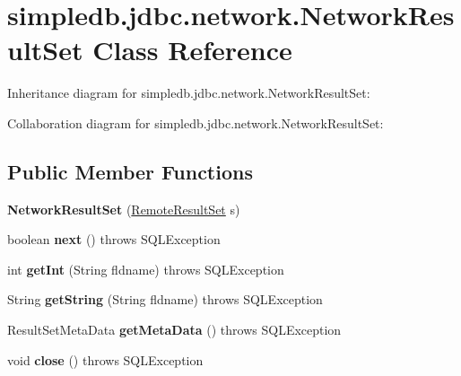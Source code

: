 \hypertarget{classsimpledb_1_1jdbc_1_1network_1_1NetworkResultSet}{}\section{simpledb.\+jdbc.\+network.\+Network\+Result\+Set Class Reference}
\label{classsimpledb_1_1jdbc_1_1network_1_1NetworkResultSet}


Inheritance diagram for simpledb.\+jdbc.\+network.\+Network\+Result\+Set\+:


Collaboration diagram for simpledb.\+jdbc.\+network.\+Network\+Result\+Set\+:
\subsection*{Public Member Functions}
\begin{DoxyCompactItemize}
\item 
\mbox{\label{classsimpledb_1_1jdbc_1_1network_1_1NetworkResultSet_a20a2fb4ef84d7cb1e9a1fdd016fba862}} 
{\bfseries Network\+Result\+Set} (\hyperlink{interfacesimpledb_1_1jdbc_1_1network_1_1RemoteResultSet}{Remote\+Result\+Set} s)
\item 
\mbox{\label{classsimpledb_1_1jdbc_1_1network_1_1NetworkResultSet_aeca07802f038885f05fd6a73cfcdc227}} 
boolean {\bfseries next} ()  throws S\+Q\+L\+Exception 
\item 
\mbox{\label{classsimpledb_1_1jdbc_1_1network_1_1NetworkResultSet_afb52cbfecb9dd87367f8b60930441dbc}} 
int {\bfseries get\+Int} (String fldname)  throws S\+Q\+L\+Exception 
\item 
\mbox{\label{classsimpledb_1_1jdbc_1_1network_1_1NetworkResultSet_a80cc1dbf9ee91721a1a01085498ea550}} 
String {\bfseries get\+String} (String fldname)  throws S\+Q\+L\+Exception 
\item 
\mbox{\label{classsimpledb_1_1jdbc_1_1network_1_1NetworkResultSet_abe3c50d42eb13c3590af3c7c629274e1}} 
Result\+Set\+Meta\+Data {\bfseries get\+Meta\+Data} ()  throws S\+Q\+L\+Exception 
\item 
\mbox{\label{classsimpledb_1_1jdbc_1_1network_1_1NetworkResultSet_a669f862f503ae45b524e9d1a02f7f334}} 
void {\bfseries close} ()  throws S\+Q\+L\+Exception 
\end{DoxyCompactItemize}


